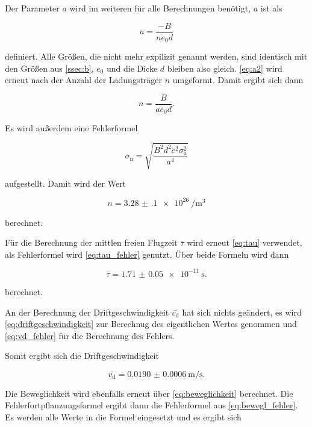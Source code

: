 Der Parameter $a$ wird im weiteren für alle Berechnungen benötigt, $a$ ist als 

\begin{equation}
    a = \frac{-B}{n e_0 d}
    \label{eq:a2}
\end{equation}

definiert.
Alle Größen, die nicht mehr expilizit genannt werden, sind identisch mit den Größen aus \autoref{ssec:b}, $e_0$ und die Dicke $d$ bleiben also gleich.
\autoref{eq:a2} wird erneut nach der Anzahl der Ladungsträger $n$ umgeformt.
Damit ergibt sich dann

\begin{equation}
    n = \frac{B}{a e_0 d}.
    \label{eq:n2}
\end{equation}

Es wird außerdem eine Fehlerformel 

\begin{equation}
    \sigma _\text{n} = \sqrt{\frac {B^{2} d^{2} e^{2} \sigma_{a}^{2} }{a^{4}}}
    \label{eq:n2_fehler}
\end{equation}

aufgestellt.
Damit wird der Wert

\begin{equation}
    n = \SI{3.28(10)e26}{\per\cubic\meter}
    \label{eq:n2_wert}
\end{equation}

berechnet.

Für die Berechnung der mittlen freien Flugzeit $\bar{\tau}$ wird erneut \autoref{eq:tau} verwendet, als Fehlerformel wird \autoref{eq:tau_fehler} genutzt.
Über beide Formeln wird dann 

\begin{equation}
    \bar{\tau} = \SI{1.71(5)e-11}{\second}.
    \label{eq:Tau2}
\end{equation}

berechnet.

An der Berechnung der Driftgeschwindigkeit $\bar{v_\text{d}}$ hat sich nichts geändert, es wird \autoref{eq:driftgeschwindigkeit} zur Berechnug des eigentlichen Wertes genommen und \autoref{eq:vd_fehler} für die Berechnung des Fehlers.

Somit ergibt sich die Driftgeschwindigkeit

\begin{equation}
    \bar{v_\text{d}} = \SI{0.0190(6)}{\meter\per\second}.
    \label{eq:vd2}
\end{equation}

Die Beweglichkeit wird ebenfalls erneut über \autoref{eq:beweglichkeit} berechnet.
Die Fehlerfortpflanzungsformel ergibt dann die Fehlerformel aus \autoref{eq:bewegl_fehler}.
Es werden alle Werte in die Formel eingesetzt und es ergibt sich 

